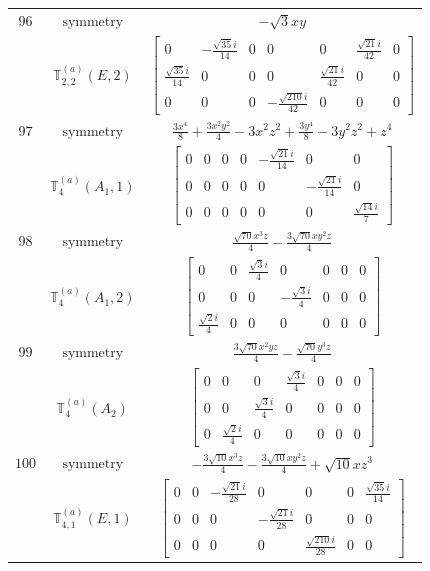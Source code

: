 \documentclass[fleqn,8pt,landscape]{jsarticle}
\begin{document}
\begin{longtable}{ccc}
$ 96 $ & $ \text{symmetry} $ & $ - \sqrt{3} x y $ \\
$  $ & $ \mathbb{T}_{2,2}^{(a)}(E,2) $ & $ \begin{bmatrix} 0 & - \frac{\sqrt{35} i}{14} & 0 & 0 & 0 & \frac{\sqrt{21} i}{42} & 0 \\ \frac{\sqrt{35} i}{14} & 0 & 0 & 0 & \frac{\sqrt{21} i}{42} & 0 & 0 \\ 0 & 0 & 0 & - \frac{\sqrt{210} i}{42} & 0 & 0 & 0 \end{bmatrix} $ \\ \hline
$ 97 $ & $ \text{symmetry} $ & $ \frac{3 x^{4}}{8} + \frac{3 x^{2} y^{2}}{4} - 3 x^{2} z^{2} + \frac{3 y^{4}}{8} - 3 y^{2} z^{2} + z^{4} $ \\
$  $ & $ \mathbb{T}_{4}^{(a)}(A_{1},1) $ & $ \begin{bmatrix} 0 & 0 & 0 & 0 & - \frac{\sqrt{21} i}{14} & 0 & 0 \\ 0 & 0 & 0 & 0 & 0 & - \frac{\sqrt{21} i}{14} & 0 \\ 0 & 0 & 0 & 0 & 0 & 0 & \frac{\sqrt{14} i}{7} \end{bmatrix} $ \\ \hline
$ 98 $ & $ \text{symmetry} $ & $ \frac{\sqrt{70} x^{3} z}{4} - \frac{3 \sqrt{70} x y^{2} z}{4} $ \\
$  $ & $ \mathbb{T}_{4}^{(a)}(A_{1},2) $ & $ \begin{bmatrix} 0 & 0 & \frac{\sqrt{3} i}{4} & 0 & 0 & 0 & 0 \\ 0 & 0 & 0 & - \frac{\sqrt{3} i}{4} & 0 & 0 & 0 \\ \frac{\sqrt{2} i}{4} & 0 & 0 & 0 & 0 & 0 & 0 \end{bmatrix} $ \\ \hline
$ 99 $ & $ \text{symmetry} $ & $ \frac{3 \sqrt{70} x^{2} y z}{4} - \frac{\sqrt{70} y^{3} z}{4} $ \\
$  $ & $ \mathbb{T}_{4}^{(a)}(A_{2}) $ & $ \begin{bmatrix} 0 & 0 & 0 & \frac{\sqrt{3} i}{4} & 0 & 0 & 0 \\ 0 & 0 & \frac{\sqrt{3} i}{4} & 0 & 0 & 0 & 0 \\ 0 & \frac{\sqrt{2} i}{4} & 0 & 0 & 0 & 0 & 0 \end{bmatrix} $ \\ \hline
$ 100 $ & $ \text{symmetry} $ & $ - \frac{3 \sqrt{10} x^{3} z}{4} - \frac{3 \sqrt{10} x y^{2} z}{4} + \sqrt{10} x z^{3} $ \\
$  $ & $ \mathbb{T}_{4,1}^{(a)}(E,1) $ & $ \begin{bmatrix} 0 & 0 & - \frac{\sqrt{21} i}{28} & 0 & 0 & 0 & \frac{\sqrt{35} i}{14} \\ 0 & 0 & 0 & - \frac{\sqrt{21} i}{28} & 0 & 0 & 0 \\ 0 & 0 & 0 & 0 & \frac{\sqrt{210} i}{28} & 0 & 0 \end{bmatrix} $ \\ \hline

\end{longtable}
\end{document}
